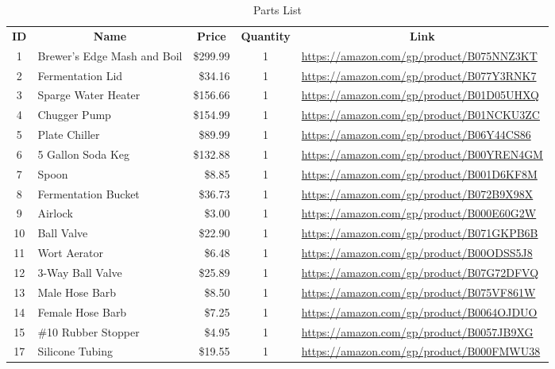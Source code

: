 \begin{table}[h!]
\centering
\begin{tabularx}{\textwidth}{clrcX}
    \toprule
    \multicolumn{1}{c}{\textbf{ID}} &\multicolumn{1}{c}{\textbf{Name}} & \multicolumn{1}{c}{\textbf{Price}} & \textbf{Quantity} & \multicolumn{1}{c}{\textbf{Link}} \\
    1 & Brewer's Edge Mash and Boil & \$299.99 & 1 & {\tiny\url{https://amazon.com/gp/product/B075NNZ3KT}} \\
    2 & Fermentation Lid & \$34.16 & 1 & {\tiny\url{https://amazon.com/gp/product/B077Y3RNK7}} \\
    3 & Sparge Water Heater & \$156.66 & 1 & {\tiny\url{https://amazon.com/gp/product/B01D05UHXQ}} \\
    4 & Chugger Pump & \$154.99 & 1 & {\tiny\url{https://amazon.com/gp/product/B01NCKU3ZC}} \\
    5 & Plate Chiller & \$89.99 & 1 & {\tiny\url{https://amazon.com/gp/product/B06Y44CS86}} \\
    6 & 5 Gallon Soda Keg & \$132.88 & 1 & {\tiny\url{https://amazon.com/gp/product/B00YREN4GM}} \\
    7 & Spoon & \$8.85 & 1 & {\tiny\url{https://amazon.com/gp/product/B001D6KF8M}} \\
    8 & Fermentation Bucket & \$36.73 & 1 & {\tiny\url{https://amazon.com/gp/product/B072B9X98X}} \\
    9 & Airlock & \$3.00 & 1 & {\tiny\url{https://amazon.com/gp/product/B000E60G2W}} \\
    10 & Ball Valve & \$22.90 & 1 & {\tiny\url{https://amazon.com/gp/product/B071GKPB6B}} \\
    11 & Wort Aerator & \$6.48 & 1 & {\tiny\url{https://amazon.com/gp/product/B00ODSS5J8}} \\
    12 & 3-Way Ball Valve & \$25.89 & 1 & {\tiny\url{https://amazon.com/gp/product/B07G72DFVQ}} \\
    13 & Male Hose Barb & \$8.50 & 1 & {\tiny\url{https://amazon.com/gp/product/B075VF861W}} \\
    14 & Female Hose Barb & \$7.25 & 1 & {\tiny\url{https://amazon.com/gp/product/B0064OJDUO}} \\
    15 & \#10 Rubber Stopper & \$4.95 & 1 & {\tiny\url{https://amazon.com/gp/product/B0057JB9XG}} \\
    17 & Silicone Tubing & \$19.55 & 1 & {\tiny\url{https://amazon.com/gp/product/B000FMWU38}} \\
    \bottomrule
\end{tabularx}
\caption{Parts List}\label{tab:partslist}
\end{table}

